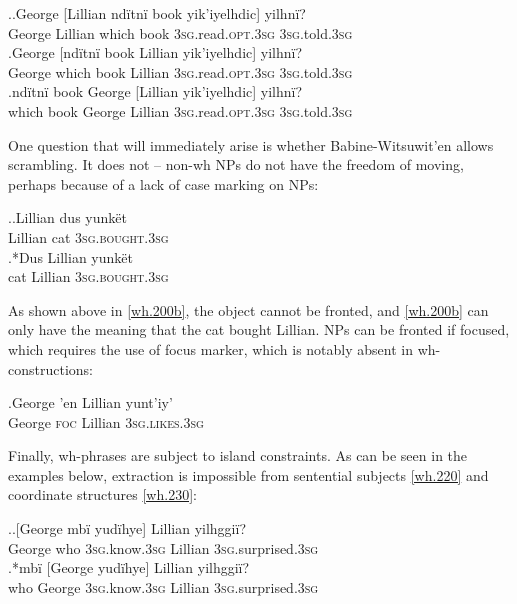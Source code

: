 \documentclass[charis]{glossa}
\begin{document}
\ex.\ag.\label{wh.190a}George [Lillian nd\"itn\"i book yik'iyelhdic] yilhn\"i?\\
   George Lillian which book \textsc{3sg}.read.\textsc{opt.3sg} \textsc{3sg}.told.\textsc{3sg}\\
   \bg.\label{wh.190b}George [nd\"itn\"i book Lillian yik'iyelhdic] yilhn\"i?\\
   George which book Lillian \textsc{3sg}.read.\textsc{opt.3sg} \textsc{3sg}.told.\textsc{3sg}\\
   \bg.\label{wh.190c}nd\"itn\"i book George [Lillian yik'iyelhdic] yilhn\"i?\\
   which book George Lillian \textsc{3sg}.read.\textsc{opt.3sg} \textsc{3sg}.told.\textsc{3sg}\\

One question that will immediately arise is whether Babine-Witsuwit'en allows scrambling. It does not -- non-wh NPs do not have the freedom of moving, perhaps because of a lack of case marking on NPs:

\ex.\ag.\label{wh.200a}Lillian dus yunk\"et\\
   Lillian cat \textsc{3sg.bought.3sg}\\
   \bg.*\label{wh.200b}Dus Lillian yunk\"et\\
   cat Lillian \textsc{3sg.bought.3sg}\\

As shown above in \ref{wh.200b}, the object cannot be fronted, and \ref{wh.200b} can only have the meaning that the cat bought Lillian. NPs can be fronted if focused, which requires the use of focus marker, which is notably absent in wh-constructions:

\exg.\label{wh.210}George 'en Lillian yunt'iy'\\
   George \textsc{foc} Lillian \textsc{3sg.likes.3sg}\\

Finally, wh-phrases are subject to island constraints. As can be seen in the examples below, extraction is impossible from sentential subjects \ref{wh.220} and coordinate structures \ref{wh.230}:

\ex.\label{wh.220}\ag.{}[George mb\"i yud\"ihye] Lillian yilhggi\"i?\\
   George who \textsc{3sg}.know.\textsc{3sg} Lillian \textsc{3sg}.surprised.\textsc{3sg}\\
   \bg.*mb\"i [George yud\"ihye] Lillian yilhggi\"i?\\
   who George \textsc{3sg}.know.\textsc{3sg} Lillian \textsc{3sg}.surprised.\textsc{3sg}\\
\end{document}
